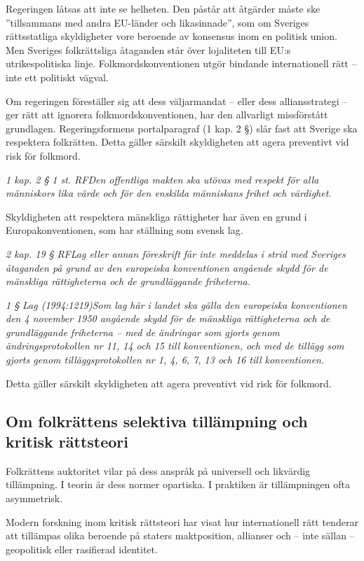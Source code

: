 \documentclass[12pt]{article}
\newcommand{\lagrum}[1]{\par\vspace{3mm}\textit{#1}\par\vspace{5mm}}
\begin{document}
Regeringen låtsas att inte se helheten. Den påstår att åtgärder måste ske ”tillsammans med andra EU-länder och likasinnade”, som om Sveriges rättsstatliga skyldigheter vore beroende av konsensus inom en politisk union. Men Sveriges folkrättsliga åtaganden står över lojaliteten till EU:s utrikespolitiska linje. Folkmordskonventionen utgör bindande internationell rätt – inte ett politiskt vägval.

Om regeringen föreställer sig att dess väljarmandat – eller dess alliansstrategi – ger rätt att ignorera folkmordskonventionen, har den allvarligt missförstått grundlagen.  
Regeringsformens portalparagraf (1 kap. 2 §) slår fast att Sverige ska respektera folkrätten. Detta gäller särskilt skyldigheten att agera preventivt vid risk för folkmord.

\lagrum{1 kap. 2 § 1 st. RF\quad Den offentliga makten ska utövas med respekt för alla människors lika värde och för den enskilda människans frihet och värdighet.}

Skyldigheten att respektera mänskliga rättigheter har även en grund i Europakonventionen, som har ställning som svensk lag.

\lagrum{2 kap. 19 § RF\quad Lag eller annan föreskrift får inte meddelas i strid med Sveriges åtaganden på grund av den europeiska konventionen angående skydd för de mänskliga rättigheterna och de grundläggande friheterna.}

\lagrum{1 § Lag (1994:1219)\quad Som lag här i landet ska gälla den europeiska konventionen den 4 november 1950 angående skydd för de mänskliga rättigheterna och de grundläggande friheterna – med de ändringar som gjorts genom ändringsprotokollen nr 11, 14 och 15 till konventionen, och med de tillägg som gjorts genom tilläggsprotokollen nr 1, 4, 6, 7, 13 och 16 till konventionen.}
Detta gäller särskilt skyldigheten att agera preventivt vid risk för folkmord.



\subsection*{Om folkrättens selektiva tillämpning och kritisk rättsteori}

Folkrättens auktoritet vilar på dess anspråk på universell och likvärdig tillämpning. I teorin är dess normer opartiska. I praktiken är tillämpningen ofta asymmetrisk.

Modern forskning inom kritisk rättsteori har visat hur internationell rätt tenderar att tillämpas olika beroende på staters maktposition, allianser och – inte sällan – geopolitisk eller rasifierad identitet.  
\end{document}
